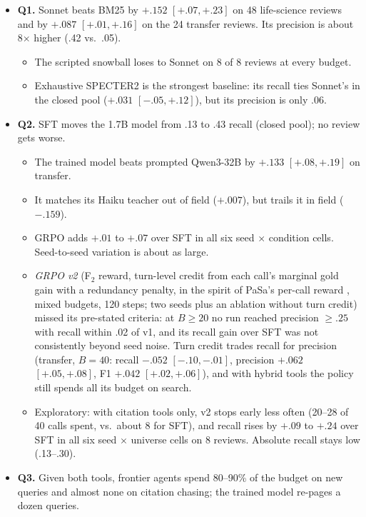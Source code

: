 \documentclass{article} %
\begin{document}
\begin{itemize}
\item \textbf{Q1.} Sonnet beats BM25 by $+.152$ $[+.07, +.23]$ on 48 life-science reviews and by
  $+.087$ $[+.01, +.16]$ on the 24 transfer reviews. Its precision is about 8$\times$ higher (.42
  vs.\ .05).
  \begin{itemize}
  \item The scripted snowball loses to Sonnet on 8 of 8 reviews at every budget.
  \item Exhaustive SPECTER2 is the strongest baseline: its recall ties Sonnet's in the closed
    pool ($+.031$ $[-.05, +.12]$), but its precision is only .06.
  \end{itemize}
\item \textbf{Q2.} SFT moves the 1.7B model from .13 to .43 recall (closed pool); no review
  gets worse.
  \begin{itemize}
  \item The trained model beats prompted Qwen3-32B by $+.133$ $[+.08, +.19]$ on transfer.
  \item It matches its Haiku teacher out of field ($+.007$), but trails it in field ($-.159$).
  \item GRPO adds $+.01$ to $+.07$ over SFT in all six seed $\times$ condition cells. Seed-to-seed
    variation is about as large.
  \item \emph{GRPO v2} (F$_2$ reward, turn-level credit from each call's marginal gold gain with a
    redundancy penalty, in the spirit of PaSa's per-call reward \citep{he2025pasa}, mixed budgets,
    120 steps; two seeds plus an ablation without turn credit) missed its pre-stated criteria: at
    $B\ge 20$ no run reached precision $\ge .25$ with recall within .02 of v1, and its recall gain
    over SFT was not consistently beyond seed noise. Turn credit trades recall for precision
    (transfer, $B=40$: recall $-.052$ $[-.10, -.01]$, precision $+.062$ $[+.05, +.08]$, F1 $+.042$
    $[+.02, +.06]$), and with hybrid tools the policy still spends all its budget on search.
  \item Exploratory: with citation tools only, v2 stops early less often (20--28 of 40 calls spent,
    vs.\ about 8 for SFT), and recall rises by $+.09$ to $+.24$ over SFT in all six seed
    $\times$ universe cells on 8 reviews. Absolute recall stays low (.13--.30).
  \end{itemize}
\item \textbf{Q3.} Given both tools, frontier agents spend 80--90\% of the budget on new
  queries and almost none on citation chasing; the trained model re-pages a dozen queries.

\end{itemize}
\end{document}
